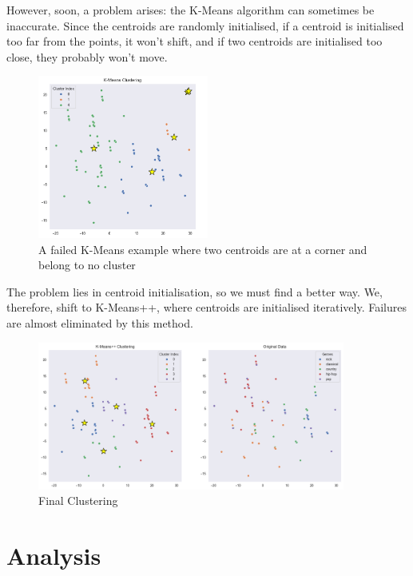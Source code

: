 \documentclass{article}
\begin{document}
However, soon, a problem arises: the K-Means algorithm can sometimes be inaccurate. Since the centroids are randomly initialised, if a centroid is initialised too far from the points, it won't shift, and if two centroids are initialised too close, they probably won't move.

\begin{figure}[h]
    \centering
    \includegraphics[width=0.5\textwidth]{fail.png} %
    \caption{A failed K-Means example where two centroids are at a corner and belong to no cluster}
    \label{fig:failure}
\end{figure}
The problem lies in centroid initialisation, so we must find a better way. We, therefore, shift to K-Means++, where centroids are initialised iteratively. Failures are almost eliminated by this method.
\begin{figure}[h]
    \centering
    \includegraphics[width=0.9\textwidth]{output.png} %
    \caption{Final Clustering}
    \label{fig:output}
\end{figure}
\pagebreak
\section{Analysis}
\end{document}
